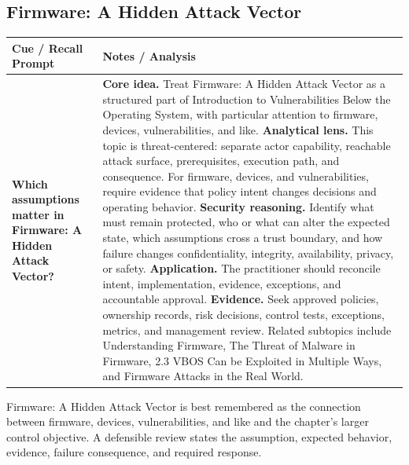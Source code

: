 \documentclass[11pt]{article}
\newcommand{\CornellHeader}{%
\rowcolor{Navy}\color{white}\bfseries Cue / Recall Prompt & \color{white}\bfseries Notes / Analysis\\\hline}
\newcommand{\CornellRow}[2]{%
\cellcolor{CueGray}\RaggedRight\textbf{#1} & \RaggedRight #2\\\hline}
\begin{document}
\subsection*{Firmware: A Hidden Attack Vector}
\begin{longtable}{>{\RaggedRight\arraybackslash}p{}|>{\RaggedRight\arraybackslash}p{}}
\CornellHeader
\CornellRow{Which assumptions matter in Firmware: A Hidden Attack Vector?}{\textbf{Core idea.} Treat Firmware: A Hidden Attack Vector as a structured part of Introduction to Vulnerabilities Below the Operating System, with particular attention to firmware, devices, vulnerabilities, and like. \textbf{Analytical lens.} This topic is threat-centered: separate actor capability, reachable attack surface, prerequisites, execution path, and consequence. For firmware, devices, and vulnerabilities, require evidence that policy intent changes decisions and operating behavior. \textbf{Security reasoning.} Identify what must remain protected, who or what can alter the expected state, which assumptions cross a trust boundary, and how failure changes confidentiality, integrity, availability, privacy, or safety. \textbf{Application.} The practitioner should reconcile intent, implementation, evidence, exceptions, and accountable approval. \textbf{Evidence.} Seek approved policies, ownership records, risk decisions, control tests, exceptions, metrics, and management review. Related subtopics include Understanding Firmware, The Threat of Malware in Firmware, 2.3 VBOS Can be Exploited in Multiple Ways, and Firmware Attacks in the Real World.}
\end{longtable}
\begin{topicsummary}
Firmware: A Hidden Attack Vector is best remembered as the connection between firmware, devices, vulnerabilities, and like and the chapter's larger control objective. A defensible review states the assumption, expected behavior, evidence, failure consequence, and required response.
\end{topicsummary}
\end{document}
